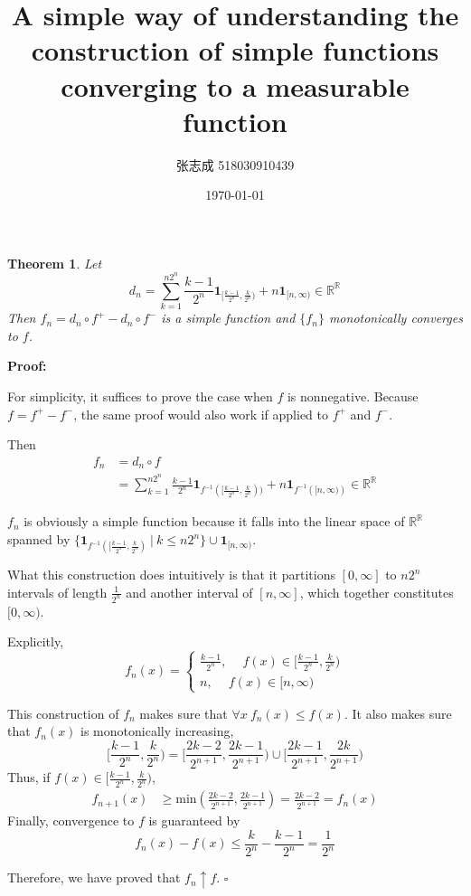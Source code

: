 \documentclass[UTF8, 12pt]{article}
\title{A simple way of understanding the construction of simple functions converging to a measurable function}
\author{张志成 518030910439}
\date{\today}
\newenvironment{proof}{\noindent\ignorespaces\textbf{Proof:}}{\hfill $\square$\par\noindent}
\newtheorem*{theorem*}{Theorem}
\begin{document}
    \maketitle
    \begin{theorem*}
        Let $$ d_n = \sum_{k=1}^{n2^n} \frac{k-1}{2^n}\textbf{1}_{[\frac{k-1}{2^n}, \frac{k}{2^n})} + n\textbf{1}_{[n,\infty)} \in \mathbb{R}^\mathbb{R} $$
        Then $f_n = d_n \circ f^+ - d_n \circ f^-$ is a simple function and $\{f_n\}$ monotonically converges to $f$.
    \end{theorem*}

    \begin{proof}

        For simplicity, it suffices to prove the case when $f$ is nonnegative. Because $f = f^+ - f^-$, the same proof would also work if applied to $f^+$ and $f^-$.
        
        Then
        \begin{align*} 
            f_n &= d_n \circ f \\
            & = \sum_{k=1}^{n2^n} \frac{k-1}{2^n}\textbf{1}_{f^{-1}([\frac{k-1}{2^n}, \frac{k}{2^n}))} + n\textbf{1}_{f^{-1}({[n,\infty)})} \in \mathbb{R}^\mathbb{R}
        \end{align*}

        $f_n$ is obviously a simple function because it falls into the linear space of $\mathbb{R}^\mathbb{R}$ spanned by $\{\textbf{1}_{f^{-1}([\frac{k-1}{2^n}, \frac{k}{2^n})}\ |\ k \leq n2^n\}  \cup \textbf{1}_{[n,\infty)} $. 

        What this construction does intuitively is that it partitions $[0, \infty]$ to $n2^n$ intervals of length $\frac{1}{2^n}$ and another interval of $[n,\infty]$, which together constitutes $[0, \infty)$. 

        Explicitly, 
        \[
        f_n(x) =  
            \begin{cases}
                \frac{k-1}{2^n}, \quad \ f(x) \in [\frac{k-1}{2^n}, \frac{k}{2^n}) \\
                n, \quad \  f(x) \in [n, \infty)
            \end{cases}
        \]

        This construction of $f_n$ makes sure that $\forall x\ f_n(x) \leq f(x)$.
        It also makes sure that $f_n(x)$ is monotonically increasing, 
        $$
        [\frac{k-1}{2^n}, \frac{k}{2^n}) = [\frac{2k-2}{2^{n+1}}, \frac{2k-1}{2^{n+1}}) \cup [\frac{2k-1}{2^{n+1}}, \frac{2k}{2^{n+1}})
        $$
        Thus, if $f(x) \in [\frac{k-1}{2^n}, \frac{k}{2^n})$, 
        \begin{align*}
            f_{n+1}(x) &\geq \text{min}(\frac{2k-2}{2^{n+1}}, \frac{2k-1}{2^{n+1}}) = \frac{2k-2}{2^{n+1}} = f_n(x)
        \end{align*}
        Finally, convergence to $f$ is guaranteed by $$ f_n(x) - f(x) \leq \frac{k}{2^n} - \frac{k-1}{2^n} = \frac{1}{2^n} $$
    
        Therefore, we have proved that $f_n \uparrow f$. 
    \end{proof}
\end{document}

